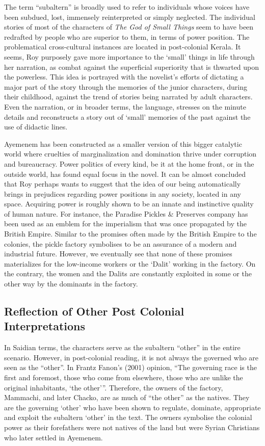 The term “subaltern” is broadly used to refer to individuals whose voices have been subdued, lost, immensely reinterpreted or simply neglected. The individual stories of most of the characters of \emph{The God of Small Things} seem to have been redrafted by people who are superior to them, in terms of power position. The problematical cross-cultural instances are located in post-colonial Kerala. It seems, Roy purposely gave more importance to the ‘small’ things in life through her narration, as combat against the superficial superiority that is thwarted upon the powerless. This idea is portrayed with the novelist’s efforts of dictating a major part of the story through the memories of the junior characters, during their childhood, against the trend of stories being narrated by adult characters. Even the narration, or in broader terms, the language, stresses on the minute details and reconstructs a story out of ‘small’ memories of the past against the use of didactic lines. 

Ayemenem has been constructed as a smaller version of this bigger catalytic world where cruelties of marginalization and domination thrive under corruption and bureaucracy. Power politics of every kind, be it at the home front, or in the outside world, has found equal focus in the novel. It can be almost concluded that Roy perhaps wants to suggest that the idea of our being automatically brings in prejudices regarding power positions in any society, located in any space. Acquiring power is roughly shown to be an innate and instinctive quality of human nature. For instance, the Paradise Pickles \& Preserves company has been used as an emblem for the imperialism that was once propagated by the British Empire. Similar to the promises often made by the British Empire to the colonies, the pickle factory symbolises to be an assurance of a modern and industrial future. However, we eventually see that none of these promises materializes for the low-income workers or the `Dalit' working in the factory. On the contrary, the women and the Dalits are constantly exploited in some or the other way by the dominants in the factory. 

\subsection{Reflection of Other Post Colonial Interpretations}

In Saidian terms, the characters serve as the subaltern “other” in the entire scenario. However, in post-colonial reading, it is not always the governed who are seen as the “other”. In Frantz Fanon’s (2001) opinion, “The governing race is the first and foremost, those who come from elsewhere, those who are unlike the original inhabitants, ‘the other’”. Therefore, the owners of the factory, Mammachi, and later Chacko, are as much of “the other” as the natives. They are the governing ‘other’ who have been shown to regulate, dominate, appropriate and exploit the subaltern ‘other’ in the text. The owners symbolise the colonial power as their forefathers were not natives of the land but were Syrian Christians who later settled in Ayemenem.

